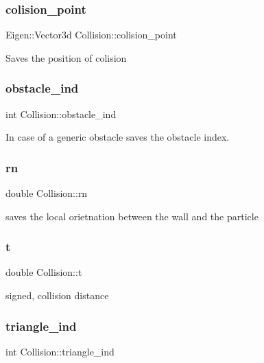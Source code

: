\subsubsection{\texorpdfstring{colision\+\_\+point}{colision\_point}}
{\footnotesize\ttfamily Eigen\+::\+Vector3d Collision\+::colision\+\_\+point}

Saves the position of colision \mbox{\label{class_collision_ad1f81d05e175689b7e31bf36121d1589}} 
\subsubsection{\texorpdfstring{obstacle\+\_\+ind}{obstacle\_ind}}
{\footnotesize\ttfamily int Collision\+::obstacle\+\_\+ind}

In case of a generic obstacle saves the obstacle index. \mbox{\label{class_collision_a95898b1296dfa87b78e8a1197f0f5ea2}} 
\subsubsection{\texorpdfstring{rn}{rn}}
{\footnotesize\ttfamily double Collision\+::rn}

saves the local orietnation between the wall and the particle \mbox{\label{class_collision_a195d201b0843d9f7190ac3a27761b4e7}} 
\subsubsection{\texorpdfstring{t}{t}}
{\footnotesize\ttfamily double Collision\+::t}

signed, collision distance \mbox{\label{class_collision_a50dfece7495474875117cfbb3c4f524d}} 
\subsubsection{\texorpdfstring{triangle\+\_\+ind}{triangle\_ind}}
{\footnotesize\ttfamily int Collision\+::triangle\+\_\+ind}

